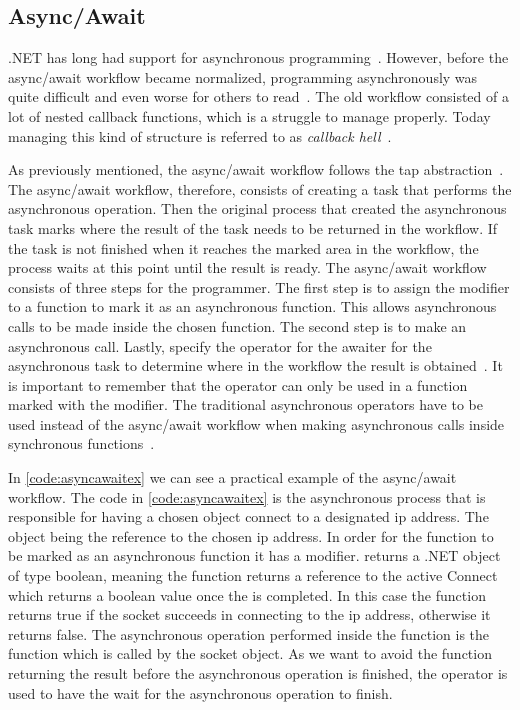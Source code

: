 \subsection{Async/Await}
.NET has long had support for asynchronous programming~\cite{WEB:asyncNelsen}. However, before the async/await workflow became normalized, programming asynchronously was quite difficult and even worse for others to read~\cites{DOC:TaskAsyncProgModel, WEB:asyncNelsen}. The old workflow consisted of a lot of nested callback functions, which is a struggle to manage properly. Today managing this kind of structure is referred to as \emph{callback hell}~\cites[p.~1-2]{PAPER:Callbackhell}[p~.2]{PAPER:PaxosCleipnir}.

As previously mentioned, the async/await workflow follows the \ac{tap} abstraction~\cite{DOC:TaskAsyncProgModel}.  The async/await workflow, therefore, consists of creating a task that performs the asynchronous operation. Then the original process that created the asynchronous task marks where the result of the task needs to be returned in the workflow. If the task is not finished when it reaches the marked area in the workflow, the process waits at this point until the result is ready. 
The async/await workflow consists of three steps for the programmer. The first step is to assign the  modifier to a function to mark it as an asynchronous function. This allows asynchronous calls to be made inside the chosen function. The second step is to make an asynchronous call. Lastly, specify the  operator for the awaiter for the asynchronous task to determine where in the workflow the result is obtained~\cite{WEB:AsyncAwaitTut, DOC:AsyncAwait, VIDEO:AsyncConBack}.
It is important to remember that the  operator can only be used in a function marked with the  modifier. The traditional asynchronous operators have to be used instead of the async/await workflow when making asynchronous calls inside synchronous functions~\cite{DOC:AsyncAwait, DOC:TaskAsyncProgModel}.

In \autoref{code:asyncawaitex} we can see a practical example of the async/await workflow.
The code in \autoref{code:asyncawaitex} is the asynchronous process that is responsible for having a chosen  object connect to a designated \ac{ip} address. The  object being the reference to the chosen \ac{ip} address. In order for the  function to be marked as an asynchronous function it has a  modifier.  returns a .NET  object of type boolean, meaning the function returns a reference to the active Connect  which returns a boolean value once the  is completed. In this case the  function returns true if the socket succeeds in connecting to the \ac{ip} address, otherwise it returns false. The asynchronous operation performed inside the  function is the  function which is called by the socket object. As we want to avoid the function returning the result before the asynchronous operation is finished, the  operator is used to have the  wait for the   asynchronous operation to finish.

